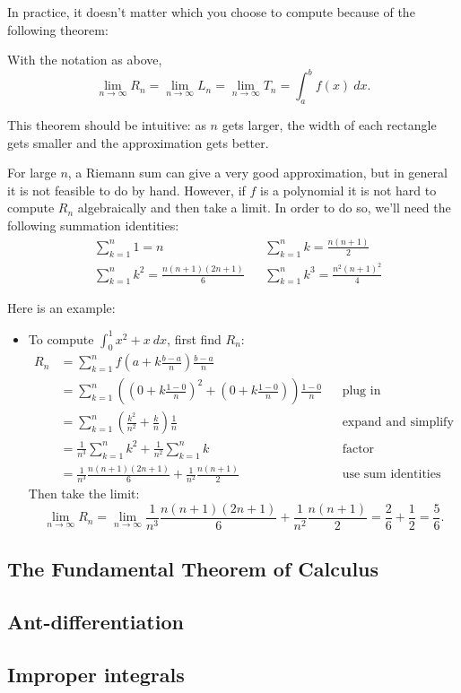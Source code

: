 In practice, it doesn't matter which you choose to compute because of the following theorem:
\begin{thm} With the notation as above,
$$\lim_{n\to\infty}R_n=\lim_{n\to\infty}L_n=\lim_{n\to\infty}T_n=\int_a^bf(x)\ dx.$$
\end{thm}

This theorem should be intuitive: as $n$ gets larger, the width of each rectangle gets smaller and the approximation gets better.

For large $n$, a Riemann sum can give a very good approximation, but in general it is not feasible to do by hand. However, if $f$ is a polynomial it is not hard to compute $R_n$ algebraically and then take a limit. In order to do so, we'll need the following summation identities:
\begin{align*}
&\sum_{k=1}^n 1 = n 
& &
\sum_{k=1}^n k = \frac{n(n+1)}{2}\\
&\sum_{k=1}^n k^2 = \frac{n(n+1)(2n+1)}{6}
& &
\sum_{k=1}^n k^3 = \frac{n^2(n+1)^2}{4}
\end{align*}

Here is an example:
\begin{itemize}
    \item To compute $\int_{0}^{1}x^2+x\ dx$, first find $R_n$:
    \begin{align*}
        R_n
        & = \sum_{k=1}^{n}f\left(a+k\frac{b-a}{n}\right)\frac{b-a}{n}\\ 
        & = \sum_{k=1}^n\left(\left(0+k\frac{1-0}{n}\right)^2 + \left(0+k\frac{1-0}{n}\right)\right)\frac{1-0}{n}&&\text{plug in}\\
        & = \sum_{k=1}^n\left(\frac{k^2}{n^2} + \frac{k}{n}\right)\frac{1}{n} &&\text{expand and simplify}\\
        & = \frac{1}{n^3}\sum_{k=1}^nk^2+\frac{1}{n^2}\sum_{k=1}^nk && \text{factor}\\
        & = \frac{1}{n^3}\frac{n(n+1)(2n+1)}{6}+\frac{1}{n^2}\frac{n(n+1)}{2} &&\text{use sum identities}
    \end{align*}
    Then take the limit:
    $$\lim_{n\to\infty}R_n=\lim_{n\to\infty} \frac{1}{n^3}\frac{n(n+1)(2n+1)}{6}+\frac{1}{n^2}\frac{n(n+1)}{2} = \frac{2}{6} + \frac{1}{2} = \frac{5}{6}.$$
    
\end{itemize}



\subsection{The Fundamental Theorem of Calculus}


\subsection{Ant-differentiation}


\subsection{Improper integrals}














